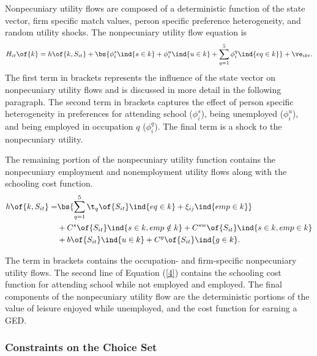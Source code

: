 \documentclass[12pt]{article}
\theoremstyle{definition}
\begin{document}
Nonpecuniary utility flows are composed of a deterministic function of the state vector, firm specific match values, person specific preference heterogeneity, and random utility shocks. The nonpecuniary utility flow equation is
\begin{equation}
    \label{3}
    H_{it}\of{k} = h\of{k, S_{it}} + \bs{\phi_i^s \ind{s \in k} + \phi_i^u \ind{u \in k} + \sum_{q=1}^{5} \phi_i^q \ind{eq \in k}} + \ve_{ikt}.
\end{equation}
The first term in brackets represents the influence of the state vector on nonpecuniary utility flows and is discussed in more detail in the following paragraph. The second term in brackets captures the effect of person specific heterogeneity in preferences for attending school ($\phi_i^s$), being unemployed ($\phi_i^u$), and being employed in occupation $q$ ($\phi_i^q$). The final term is a shock to the nonpecuniary utility.

The remaining portion of the nonpecuniary utility function contains the nonpecuniary employment and nonemployment utility flows along with the schooling cost function. 
\begin{equation}
    \label{4}
    \begin{aligned}
        h\of{k, S_{it}} = & \bs{\sum_{q=1}^{5} \t_q\of{S_{it}} \ind{eq \in k} + \xi_{ij} \ind{emp \in k}} \\
        & + C^s\of{S_{it}} \ind{s \in k, emp \notin k} + C^{sw}\of{S_{it}} \ind{s \in k, emp \in k} \\
        & + b\of{S_{it}} \ind{u \in k} + C^g\of{S_{it}} \ind{g \in k}.
    \end{aligned}
\end{equation}

The term in brackets contains the occupation- and firm-specific nonpecuniary utility flows. The second line of Equation (\ref{4}) contains the schooling cost function for attending school while not employed and employed. The final components of the nonpecuniary utility flow are the deterministic portions of the value of leisure enjoyed while unemployed, and the cost function for earning a GED.

\subsubsection{Constraints on the Choice Set} 
\end{document}
